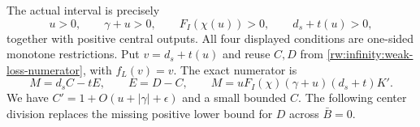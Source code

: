 The actual interval is precisely
\begin{equation}\label{rw:infinity:weak-center-domain}
 u>0,\qquad\gamma+u>0,\qquad F_I(\chi(u))>0,\qquad d_s+t(u)>0,
\end{equation}
together with positive central outputs. All four displayed conditions
are one-sided monotone restrictions. Put $v=d_s+t(u)$ and reuse $C,D$
from \eqref{rw:infinity:weak-loss-numerator}, with $f_L(v)=v$.
The exact numerator is
\begin{equation}\label{rw:infinity:weak-center-numerator}
 M=d_s C-tE,\qquad E=D-C,\qquad
 M=uF_I(\chi)(\gamma+u)(d_s+t)K'.
\end{equation}
We have $C'=1+O(u+|\gamma|+\epsilon)$ and a small bounded $C$.
The following center division replaces the missing positive lower
bound for $D$ across $\bar B=0$.

